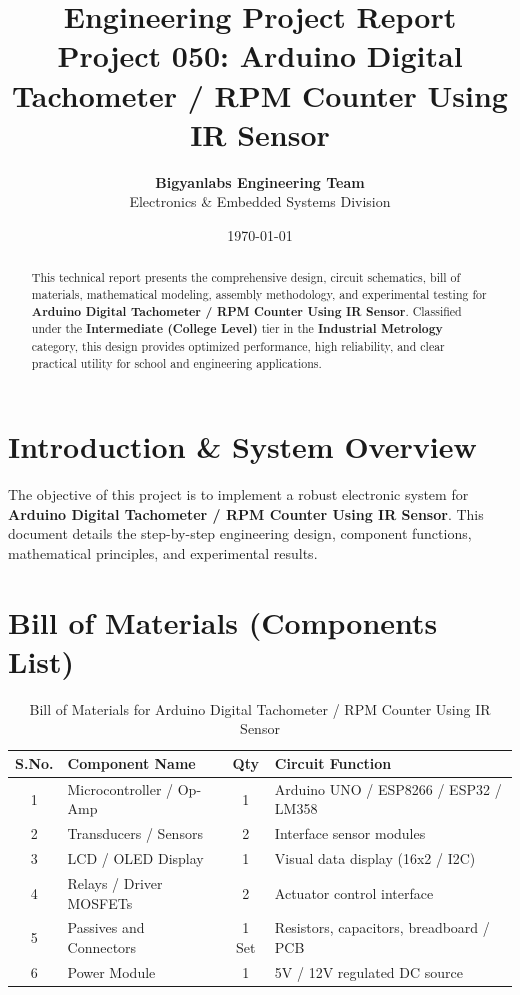 \documentclass[11pt,a4paper]{article}
\title{\textbf{\Huge Engineering Project Report}\\[0.5em] \Large Project 050: Arduino Digital Tachometer / RPM Counter Using IR Sensor}
\author{\textbf{Bigyanlabs Engineering Team}\\ Electronics \& Embedded Systems Division}
\date{\today}
\begin{document}
\maketitle
\thispagestyle{empty}

\begin{abstract}
This technical report presents the comprehensive design, circuit schematics, bill of materials, mathematical modeling, assembly methodology, and experimental testing for \textbf{Arduino Digital Tachometer / RPM Counter Using IR Sensor}. Classified under the \textbf{Intermediate (College Level)} tier in the \textbf{Industrial Metrology} category, this design provides optimized performance, high reliability, and clear practical utility for school and engineering applications.
\end{abstract}

\newpage
\tableofcontents
\newpage

\section{Introduction \& System Overview}
The objective of this project is to implement a robust electronic system for \textbf{Arduino Digital Tachometer / RPM Counter Using IR Sensor}. This document details the step-by-step engineering design, component functions, mathematical principles, and experimental results.

\section{Bill of Materials (Components List)}
\begin{table}[h!]
\centering
\caption{Bill of Materials for Arduino Digital Tachometer / RPM Counter Using IR Sensor}
\vspace{0.5em}
\begin{tabular}{clcp{7cm}}
\toprule
\textbf{S.No.} & \textbf{Component Name} & \textbf{Qty} & \textbf{Circuit Function} \\
\midrule
1 & Microcontroller / Op-Amp & 1 & Arduino UNO / ESP8266 / ESP32 / LM358 \\
2 & Transducers / Sensors & 2 & Interface sensor modules \\
3 & LCD / OLED Display & 1 & Visual data display (16x2 / I2C) \\
4 & Relays / Driver MOSFETs & 2 & Actuator control interface \\
5 & Passives and Connectors & 1 Set & Resistors, capacitors, breadboard / PCB \\
6 & Power Module & 1 & 5V / 12V regulated DC source \\
\bottomrule
\end{tabular}
\end{table}
\end{document}
